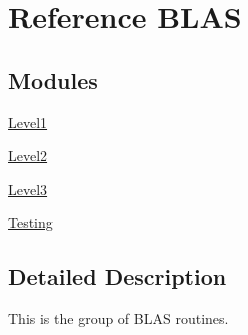 \hypertarget{group__blas}{}\section{Reference B\+L\+A\+S}
\label{group__blas}
\subsection*{Modules}
\begin{DoxyCompactItemize}
\item 
\hyperlink{group__level1}{Level1}
\item 
\hyperlink{group__level2}{Level2}
\item 
\hyperlink{group__level3}{Level3}
\item 
\hyperlink{group__blastesting}{Testing}
\end{DoxyCompactItemize}


\subsection{Detailed Description}
This is the group of B\+L\+A\+S routines. 